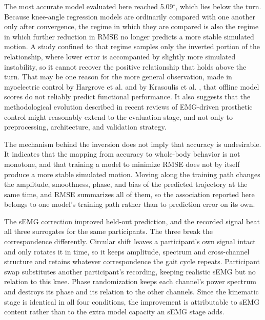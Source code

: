 \documentclass[referee,lineno,pdflatex,sn-vancouver-num]{sn-jnl}
\begin{document}
The most accurate model evaluated here reached 5.09$^{\circ}$, which
lies below the turn. Because knee-angle regression models are ordinarily compared
with one another only after convergence, the regime in which they are compared is
also the regime in which further reduction in RMSE no longer predicts a more stable
simulated motion. A study confined to that regime samples only the inverted portion of
the relationship, where lower error is accompanied by slightly more simulated
instability, so it cannot recover the positive relationship that holds above the
turn. That may be one reason for the more general observation, made in
myoelectric control by Hargrove
et al. \cite{hargrove2007} and by Krasoulis et al. \cite{krasoulis2019}, that
offline model scores do not reliably predict functional performance. It also
suggests that the methodological evolution described in recent reviews of
EMG-driven prosthetic control \cite{cimolato2022,ahkami2023} might reasonably
extend to the evaluation stage, and not only to preprocessing, architecture, and
validation strategy.

The mechanism behind the inversion does not imply that accuracy is undesirable.
It indicates that the mapping from accuracy to whole-body behavior
is not monotone, and that training a model to minimize RMSE does not by itself
produce a more stable simulated motion. Moving along the training path changes the
amplitude, smoothness, phase, and bias of the predicted trajectory at the same
time, and RMSE summarizes all of them, so the association reported here belongs
to one model's training path rather than to prediction error on its own.

The sEMG correction improved held-out prediction, and the recorded signal beat
all three surrogates for the same participants. The three break the correspondence differently. Circular shift leaves a
participant's own signal intact and only rotates it in time, so it keeps
amplitude, spectrum and cross-channel structure and retains whatever
correspondence the gait cycle repeats. Participant swap substitutes another
participant's recording, keeping realistic sEMG but no relation to this knee.
Phase randomization keeps each channel's power spectrum and destroys its phase
and its relation to the other channels. Since the kinematic stage is identical
in all four conditions, the improvement is attributable to sEMG content rather
than to the extra model capacity an sEMG stage adds.
\end{document}

